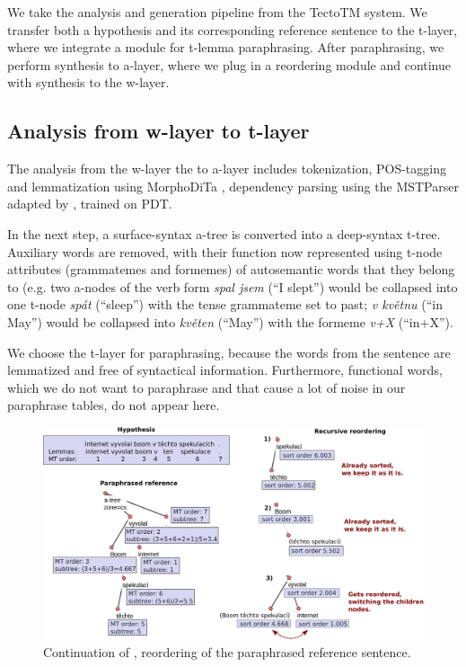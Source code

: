 We take the analysis and generation pipeline from the TectoTM system. We 
transfer both a hypothesis and its corresponding reference sentence to the 
t-layer, where we integrate a module for t-lemma paraphrasing. After 
paraphrasing, we perform synthesis to a-layer, where we plug in a reordering
module and continue with synthesis to the w-layer. 

\subsection{Analysis from w-layer to t-layer}
The analysis from the w-layer the to a-layer includes tokenization, POS-tagging and 
lemmatization using MorphoDiTa \cite{morphodita}, dependency parsing using the 
MSTParser \citep{McDonald:2005} adapted by \cite{Novak:2007}, trained on PDT.

In the next step, a surface-syntax a-tree is converted into a deep-syntax 
t-tree. Auxiliary 
words are removed, with their function now represented using t-node attributes 
(grammatemes and formemes) of autosemantic words that they belong to (e.g. two
a-nodes of the verb form \textit{spal jsem} (``I slept'') would be collapsed 
into one t-node \textit{spát} (``sleep'') with the tense grammateme set to 
past; \textit{v květnu} (``in May'') would be collapsed into \textit{květen} 
(``May'') with the formeme \textit{v+X} (``in+X'').

We choose the t-layer for paraphrasing, because the words from the sentence 
are lemmatized and free of syntactical information. Furthermore, functional 
words, which we do not want to paraphrase and that cause a lot of noise in our 
paraphrase tables, do not appear here.

\begin{figure}[tb]
\begin{center}
\includegraphics[scale=0.32]{../img/treex_paraphrasing_reordering.png} 
\caption{Continuation of , reordering of the paraphrased reference
sentence.}
\label{reordering}
\end{center}
\end{figure}

